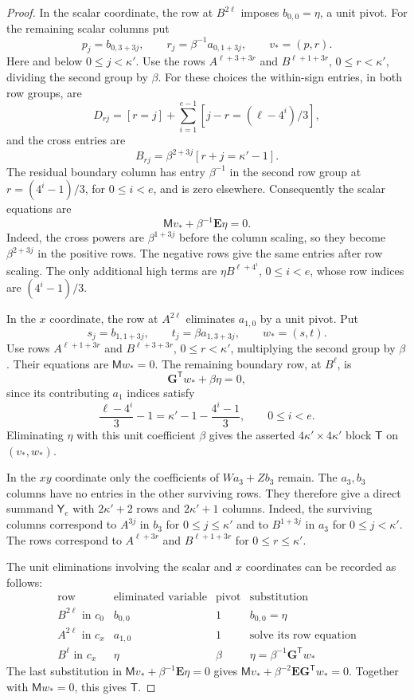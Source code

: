 \documentclass[11pt,a4paper,reqno]{amsart}
\numberwithin{equation}{section}
\theoremstyle{plain}
\theoremstyle{definition}
\theoremstyle{remark}
\begin{document}
\begin{proof}
In the scalar coordinate, the row at $B^{2\ell}$ imposes $b_{0,0}=\eta$, a unit pivot. For the remaining scalar columns put
\[
p_j=b_{0,3+3j},\qquad r_j=\beta^{-1}a_{0,1+3j},\qquad v_*=(p,r).
\]
Here and below $0\leq j<\kappa'$. Use the rows
$A^{\ell+3+3r}$ and $B^{\ell+1+3r}$, $0\leq r<\kappa'$, dividing the
second group by $\beta$. For these choices the within-sign entries, in both row groups, are
\[
D_{rj}=[r=j]+\sum_{i=1}^{e-1}[j-r=(\ell-4^i)/3],
\]
and the cross entries are
\[
B_{rj}=\beta^{2+3j}[r+j=\kappa'-1].
\]
The residual boundary column has entry $\beta^{-1}$ in the second
row group at $r=(4^i-1)/3$, for $0\leq i<e$, and is zero elsewhere.
Consequently the scalar equations are
\[
\mathsf Mv_*+\beta^{-1}\mathbf E\eta=0.
\]
Indeed, the cross powers are $\beta^{1+3j}$ before the column scaling, so they become $\beta^{2+3j}$ in the positive rows. The negative rows give the same entries after row scaling. The only additional high terms are $\eta B^{\ell+4^i}$, $0\leq i<e$, whose row indices are $(4^i-1)/3$.

In the $x$ coordinate, the row at $A^{2\ell}$ eliminates $a_{1,0}$ by a unit pivot. Put
\[
s_j=b_{1,1+3j},\qquad t_j=\beta a_{1,3+3j},\qquad w_*=(s,t).
\]
Use rows $A^{\ell+1+3r}$ and $B^{\ell+3+3r}$,
$0\leq r<\kappa'$, multiplying the second group by $\beta$.
Their equations are $\mathsf Mw_*=0$. The remaining boundary row,
at $B^\ell$, is
\[
\mathbf G^{\mathsf T}w_*+\beta\eta=0,
\]
since its contributing $a_1$ indices satisfy
\[
\frac{\ell-4^i}{3}-1=\kappa'-1-\frac{4^i-1}{3},\qquad 0\leq i<e.
\]
Eliminating $\eta$ with this unit coefficient $\beta$ gives the asserted $4\kappa'\times4\kappa'$ block $\mathsf T$ on $(v_*,w_*)$.

In the $xy$ coordinate only the coefficients of $Wa_3+Zb_3$
remain. The $a_3,b_3$ columns have no entries in the other surviving
rows. They therefore give a direct summand $\mathsf Y_e$ with
$2\kappa'+2$ rows and $2\kappa'+1$ columns. Indeed, the surviving columns correspond to $A^{3j}$ in $b_3$
for $0\leq j\leq\kappa'$ and to $B^{1+3j}$ in $a_3$ for
$0\leq j<\kappa'$. The rows correspond to $A^{\ell+3r}$ and
$B^{\ell+1+3r}$ for $0\leq r\leq\kappa'$.

The unit eliminations involving the scalar and $x$ coordinates can
be recorded as follows:
\[
\begin{array}{c|c|c|c}
\text{row}&\text{eliminated variable}&\text{pivot}&\text{substitution}\\\hline
B^{2\ell}\text{ in }c_0&b_{0,0}&1&b_{0,0}=\eta\\
A^{2\ell}\text{ in }c_x&a_{1,0}&1&\text{solve its row equation}\\
B^{\ell}\text{ in }c_x&\eta&\beta&
\eta=\beta^{-1}\mathbf G^{\mathsf T}w_*
\end{array}
\]
The last substitution in
$\mathsf Mv_*+\beta^{-1}\mathbf E\eta=0$ gives
$\mathsf Mv_*+\beta^{-2}\mathbf E\mathbf G^{\mathsf T}w_*=0$.
Together with $\mathsf Mw_*=0$, this gives $\mathsf T$.


\end{proof}
\end{document}
